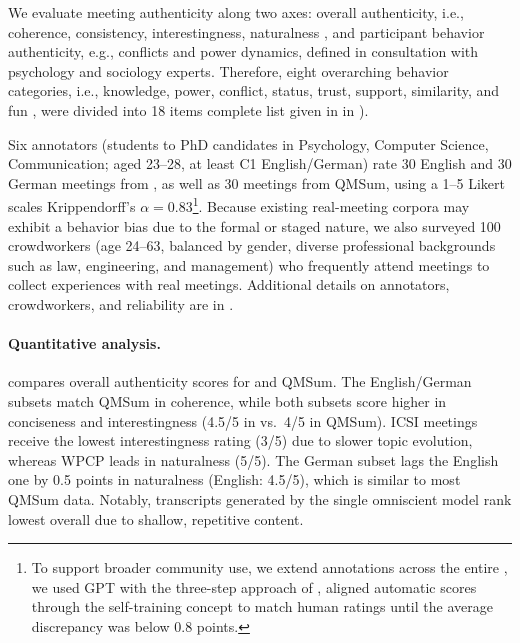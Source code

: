 We evaluate meeting authenticity along two axes: overall authenticity, i.e., coherence, consistency, interestingness, naturalness \cite{ChenPTK23}, and participant behavior authenticity, e.g., conflicts and power dynamics, defined in consultation with psychology and sociology experts.
Therefore, eight overarching behavior categories, i.e., knowledge, power, conflict, status, trust, support, similarity, and fun \cite{bales2009interaction,ChoiAVQ20}, were divided into 18 items complete list given in  in ).

Six annotators (students to PhD candidates in Psychology, Computer Science, Communication; aged 23–28, at least C1 English/German) rate 30 English and 30 German meetings from \dataset{}, as well as 30 meetings from QMSum, using a 1–5 Likert scales Krippendorff's $\alpha = 0.83$\footnote{
To support broader community use, we extend annotations across the entire \dataset{}, we used GPT with the three-step approach of \citet{KirsteinLG25}, aligned automatic scores through the self-training concept to match human ratings until the average discrepancy was below 0.8 points.
}.
Because existing real-meeting corpora may exhibit a behavior bias due to the formal or staged nature, we also surveyed 100 crowdworkers (age 24–63, balanced by gender, diverse professional backgrounds such as law, engineering, and management) who frequently attend meetings to collect experiences with real meetings.
Additional details on annotators, crowdworkers, and reliability are in .




\paragraph{Quantitative analysis.}
 compares overall authenticity scores for \dataset{} and QMSum.
The English/German \dataset{} subsets match QMSum in coherence, while both subsets score higher in conciseness and interestingness (4.5/5 in \dataset{} vs.\ 4/5 in QMSum). 
ICSI meetings receive the lowest interestingness rating (3/5) due to slower topic evolution, whereas WPCP leads in naturalness (5/5). 
The German \dataset{} subset lags the English one by 0.5 points in naturalness (English: 4.5/5), which is similar to most QMSum data.
Notably, transcripts generated by the single omniscient model rank lowest overall due to shallow, repetitive content.

